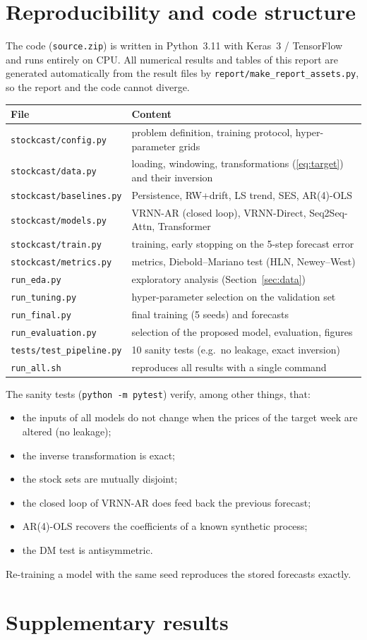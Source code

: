 \section{Reproducibility and code structure}
\label{app:code}

The code (\texttt{source.zip}) is written in Python~3.11 with Keras~3 / TensorFlow and runs entirely on CPU. All numerical results and tables of this report are generated automatically from the result files by \texttt{report/make\_report\_assets.py}, so the report and the code cannot diverge.

\begin{center}\small
\begin{tabular}{@{}ll@{}}
\toprule
File & Content \\
\midrule
\texttt{stockcast/config.py} & problem definition, training protocol, hyper-parameter grids\\
\texttt{stockcast/data.py} & loading, windowing, transformations (\ref{eq:target}) and their inversion\\
\texttt{stockcast/baselines.py} & Persistence, RW+drift, LS trend, SES, AR(4)-OLS\\
\texttt{stockcast/models.py} & VRNN-AR (closed loop), VRNN-Direct, Seq2Seq-Attn, Transformer\\
\texttt{stockcast/train.py} & training, early stopping on the 5-step forecast error\\
\texttt{stockcast/metrics.py} & metrics, Diebold--Mariano test (HLN, Newey--West)\\
\texttt{run\_eda.py} & exploratory analysis (Section~\ref{sec:data})\\
\texttt{run\_tuning.py} & hyper-parameter selection on the validation set\\
\texttt{run\_final.py} & final training (5 seeds) and forecasts\\
\texttt{run\_evaluation.py} & selection of the proposed model, evaluation, figures\\
\texttt{tests/test\_pipeline.py} & 10 sanity tests (e.g.\ no leakage, exact inversion)\\
\texttt{run\_all.sh} & reproduces all results with a single command\\
\bottomrule
\end{tabular}
\end{center}

The sanity tests (\texttt{python -m pytest}) verify, among other things, that:
\begin{itemize}[leftmargin=*]
  \item the inputs of all models do not change when the prices of the target week are altered (no leakage);
  \item the inverse transformation is exact;
  \item the stock sets are mutually disjoint;
  \item the closed loop of VRNN-AR does feed back the previous forecast;
  \item AR(4)-OLS recovers the coefficients of a known synthetic process;
  \item the DM test is antisymmetric.
\end{itemize}
Re-training a model with the same seed reproduces the stored forecasts exactly.

\section{Supplementary results}


